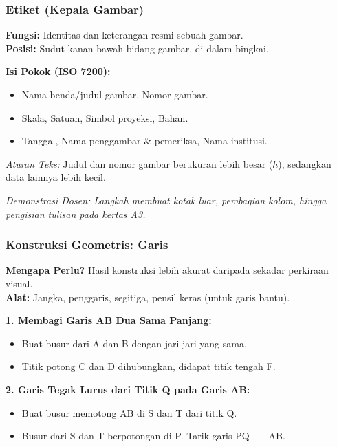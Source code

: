 \documentclass[../gbr_teknik.tex]{subfiles}
\begin{document}
\begin{frame}[mytitle=standard]
	\frametitle{Etiket (Kepala Gambar)}

	\textbf{Fungsi:} Identitas dan keterangan resmi sebuah gambar.\\
	\textbf{Posisi:} Sudut kanan bawah bidang gambar, di dalam bingkai.

	\vspace{0.5em}
	\textbf{Isi Pokok (ISO 7200):}
	\begin{itemize}
		\item Nama benda/judul gambar, Nomor gambar.
		\item Skala, Satuan, Simbol proyeksi, Bahan.
		\item Tanggal, Nama penggambar \& pemeriksa, Nama institusi.
	\end{itemize}

	\textit{Aturan Teks:} Judul dan nomor gambar berukuran lebih besar ($h$), sedangkan data lainnya lebih kecil.

	\vspace{0.5em}
	\textit{Demonstrasi Dosen: Langkah membuat kotak luar, pembagian kolom, hingga pengisian tulisan pada kertas A3.}
\end{frame}

\begin{frame}[mytitle=standard]
	\frametitle{Konstruksi Geometris: Garis}

	\textbf{Mengapa Perlu?} Hasil konstruksi lebih akurat daripada sekadar perkiraan visual. \\
	\textbf{Alat:} Jangka, penggaris, segitiga, pensil keras (untuk garis bantu).

	\vspace{0.5em}
	\textbf{1. Membagi Garis AB Dua Sama Panjang:}
	\begin{itemize}
		\item Buat busur dari A dan B dengan jari-jari yang sama.
		\item Titik potong C dan D dihubungkan, didapat titik tengah F.
	\end{itemize}

	\textbf{2. Garis Tegak Lurus dari Titik Q pada Garis AB:}
	\begin{itemize}
		\item Buat busur memotong AB di S dan T dari titik Q.
		\item Busur dari S dan T berpotongan di P. Tarik garis PQ $\perp$ AB.
	\end{itemize}
\end{frame}
\end{document}
